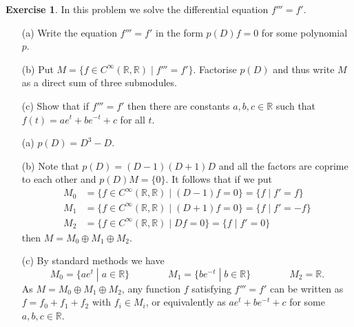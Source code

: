 \documentclass{amsart}
\newcommand{\R}         {{\mathbb{R}}}
\newcommand{\CRR}       {C^\infty(\R,\R)}
\newcommand{\st}        {\;|\;}
\newcommand{\ip}[1]     {\langle #1\rangle}
\newcommand{\op}        {\oplus}
\renewcommand{\:}{\colon}
\theoremstyle{definition}
\newtheorem{exercise}{Exercise}[section]
\renewenvironment{solution}{\SolutionAtEnd}{\endSolutionAtEnd}
\begin{document}
\begin{exercise}
 In this problem we solve the differential equation $f'''=f'$.
 \begin{itemize}
  \item[(a)] Write the equation $f'''=f'$ in the form $p(D)f=0$ for
   some polynomial $p$.
  \item[(b)] Put $M=\{f\in\CRR\st f'''=f'\}$.  Factorise $p(D)$ and
   thus write $M$ as a direct sum of three submodules.
  \item[(c)] Show that if $f'''=f'$ then there are constants
   $a,b,c\in\R$ such that $f(t)=ae^t+be^{-t}+c$ for all $t$.
 \end{itemize}
\end{exercise}
\begin{solution}
 \begin{itemize}
  \item[(a)] $p(D)=D^3-D$.
  \item[(b)] Note that $p(D)=(D-1)(D+1)D$ and all the factors are
   coprime to each other and $p(D)M=\{0\}$.  It follows that if we put
   \begin{align*}
    M_0 &= \{f\in\CRR\st (D-1)f=0\} = \{f \st f'=f\} \\
    M_1 &= \{f\in\CRR\st (D+1)f=0\} = \{f \st f'=-f\}\\
    M_2 &= \{f\in\CRR\st Df=0\} = \{f \st f'=0\}
   \end{align*}
   then $M=M_0\op M_1\op M_2$.
  \item[(c)] By standard methods we have 
   \[ 
    M_0 = \{ae^t\st a\in\R\} \hspace{4em}
    M_1 = \{be^{-t}\st b\in\R\} \hspace{4em}
    M_2 = \R.
   \]
   As $M=M_0\op M_1\op M_2$, any function $f$ satisfying $f'''=f'$ can
   be written as $f=f_0+f_1+f_2$ with $f_i\in M_i$, or equivalently as
   $ae^t+be^{-t}+c$ for some $a,b,c\in\R$.
 \end{itemize}
\end{solution}
\end{document}
